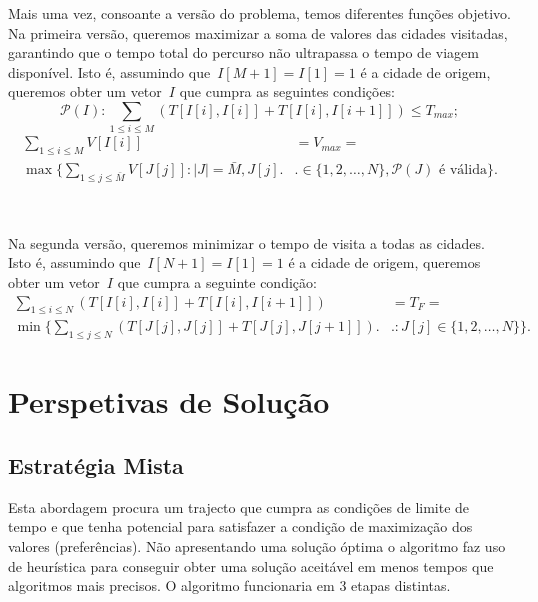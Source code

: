 \documentclass[12pt,a4paper,reqno]{report}
\numberwithin{figure}{section}
\numberwithin{equation}{section}
\begin{document}
Mais uma vez, consoante a versão do problema, temos diferentes funções objetivo. Na primeira versão, queremos maximizar a soma de valores das cidades visitadas, garantindo que o tempo total do percurso não ultrapassa o tempo de viagem disponível. Isto é, assumindo que~$I[M+1] = I[1] = 1$ é a cidade de origem, queremos obter um vetor~$I$ que cumpra as seguintes condições:
\begin{equation}
		\mathscr{P}(I): \sum_{1 \leq i \leq M} (T[I[i],I[i]] + T[I[i],I[i+1]]) \leq T_{max};
\end{equation}
\begin{equation}
	\begin{split}
		\sum_{1 \leq i \leq M} V[I[i]] & = V_{max} = \\
		\max \Bigg\{\sum_{1 \leq j \leq \bar{M}} V[J[j]] : |J| = \bar{M}, J[j] \Bigg. & \Bigg. \in \{1, 2, \ldots, N\}, \mathscr{P}(J) \text{ é válida}\Bigg\}.
	\end{split}
\end{equation}

\
\
\

Na segunda versão, queremos minimizar o tempo de visita a todas as cidades. Isto é, assumindo que~$I[N+1] = I[1] = 1$ é a cidade de origem, queremos obter um vetor~$I$ que cumpra a seguinte condição:
\begin{equation}
	\begin{align*}
		\sum_{1 \leq i \leq N} (T[I[i],I[i]] + T[I[i],I[i+1]]) & = T_F = \\
		\min \Bigg\{\sum_{1 \leq j \leq N} (T[J[j],J[j]] + T[J[j],J[j+1]]) \Bigg. & \Bigg. : J[j] \in \{1, 2, \ldots, N\}\Bigg\}.
	\end{align*}
\end{equation}

\chapter{Perspetivas de Solução}

\section{Estratégia Mista}
Esta abordagem procura um trajecto que cumpra as condições de limite de tempo e que tenha potencial para satisfazer a condição de maximização dos valores (preferências). Não apresentando uma solução óptima o algoritmo faz uso de heurística para conseguir obter uma solução aceitável em menos tempos que algoritmos mais precisos.
O algoritmo funcionaria em 3 etapas distintas.
\end{document}
